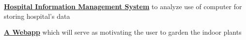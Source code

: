\textbf{\href{https://github.com/ompiepy/CProject-077-BCT-HMS}{Hospital Information Management System}} to analyze use of computer for storing hospital's data \par

\textbf{\href{https://omprakashsharma.com.np/greentech/}{A Webapp}} which will serve as motivating the user to garden the indoor plants \par
